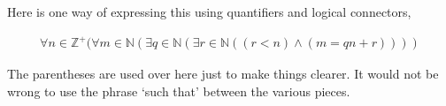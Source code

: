 \documentclass[12pt]{article}
\begin{document}
Here is one way of expressing this using quantifiers and logical connectors,

\begin{align*}
\forall n \in \mathbb{Z^+} (\forall m \in \mathbb{N} (\exists q \in \mathbb{N} (\exists r \in \mathbb{N} ((r < n) \wedge (m = qn +r))))
\end{align*}

The parentheses are used over here just to make things clearer. It would not be wrong to use the phrase `such that' between the various pieces. 
\end{document}
